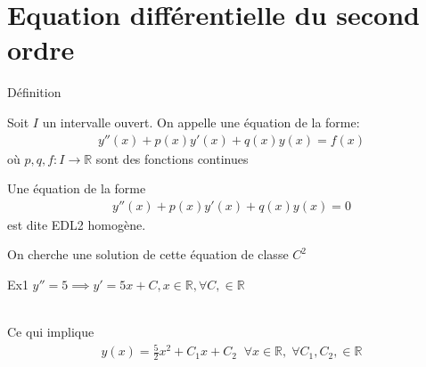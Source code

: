 
    \section{Equation différentielle du second ordre}
   
    \begin{parag}{Définition}
        \begin{definition}
            Soit $I$ un intervalle ouvert. On appelle  une équation de la forme:
            \begin{align*}
                y''(x) + p(x)y'(x) + q(x)y(x) = f(x) 
            \end{align*}
            où $p, q, f: I \to \mathbb{R}$ sont des fonctions continues
            
        \end{definition}
       
        \begin{definition}
            Une équation de la forme
            \begin{align*}
                y''(x) + p(x)y'(x) + q(x)y(x) = 0
            \end{align*}
            est dite EDL2 homogène.
 
        \end{definition}
        
        On cherche une solution de cette équation de classe $C^2$
        \begin{subparag}{Ex1}
            $y'' = 5 \implies y' = 5x + C, x \in \mathbb{R}, \forall C, \in \mathbb{R} $

           \\
           Ce qui implique
           \begin{align*}
               y(x) = \frac{5}{2}x^2 + C_1x + C_2 \; \; \forall x \in \mathbb{R}, \; \forall C_1, C_2, \in \mathbb{R}
           \end{align*}
           
        \end{subparag}
    
    \end{parag}

